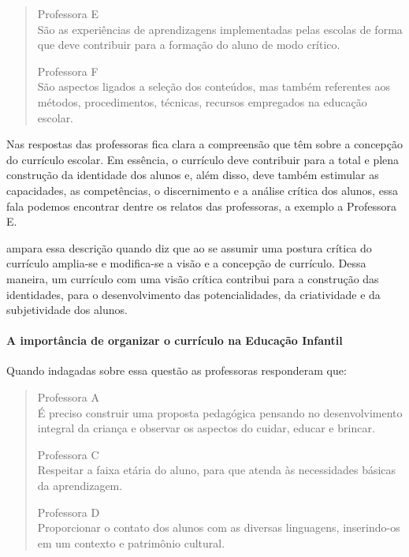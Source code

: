 \begin{refsection}
\begin{quotation}
        \negpar[-1.5em]{}Professora E\quad{}\\São as experiências de aprendizagens implementadas pelas escolas de forma que deve contribuir para a formação do aluno de modo crítico. 
        \medskip

        \negpar[-1.5em]{}Professora F\quad{}\\São aspectos ligados a seleção dos conteúdos, mas também referentes aos métodos, procedimentos, técnicas, recursos empregados na educação escolar. 
    \end{quotation}

    Nas respostas das professoras fica clara a compreensão que têm sobre a concepção do currículo escolar. Em essência, o currículo deve contribuir para a total e plena construção da identidade dos alunos e, além disso, deve também estimular as capacidades, as competências, o discernimento e a análise crítica dos alunos, essa fala podemos encontrar dentre os relatos das professoras, a exemplo a Professora E. 

    \textcite{SILVA2010Documentos} ampara essa descrição quando diz que ao se assumir uma postura crítica do currículo amplia-se e modifica-se a visão e a concepção de currículo. Dessa maneira, um currículo com uma visão crítica contribui para a construção das identidades, para o desenvolvimento das potencialidades, da criatividade e da subjetividade dos alunos. 

    \paragraph{A importância de organizar o currículo na Educação Infantil} Quando indagadas sobre essa questão as professoras responderam que: 

    \begin{quotation}
        \noindent\negpar[-1.5em]{}Professora A\quad{}\\É preciso construir uma proposta pedagógica pensando no desenvolvimento integral da criança e observar os aspectos do cuidar, educar e brincar. 
        \medskip
    
        \negpar[-1.5em]{}Professora C\quad{}\\Respeitar a faixa etária do aluno, para que atenda às necessidades básicas da aprendizagem. 
        \medskip

        \negpar[-1.5em]{}Professora D\quad{}\\Proporcionar o contato dos alunos com as diversas linguagens, inserindo-os em um contexto e patrimônio cultural. 
        \medskip


\end{quotation}
\end{refsection}
